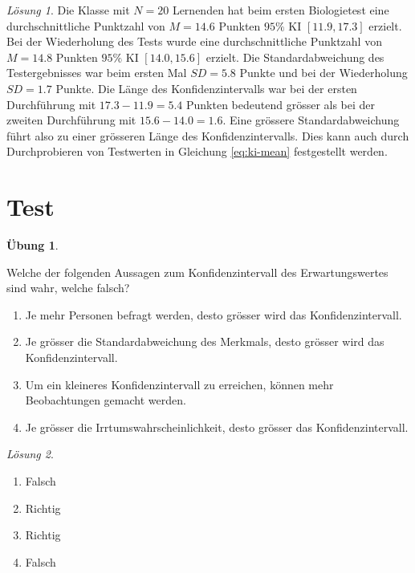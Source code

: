 \documentclass[
]{book}
\providecommand{\tightlist}{%
  \setlength{\itemsep}{0pt}\setlength{\parskip}{0pt}}
\theoremstyle{definition}
\theoremstyle{definition}
\theoremstyle{definition}
\newtheorem{exercise}{Übung}[chapter]
\theoremstyle{definition}
\theoremstyle{remark}
\newtheorem*{solution}{Lösung}
\begin{document}
\begin{solution}
Die Klasse mit \(N=20\) Lernenden hat beim ersten Biologietest eine durchschnittliche Punktzahl von \(M=14.6\) Punkten \(95\%\) KI \([11.9,17.3]\) erzielt. Bei der Wiederholung des Tests wurde eine durchschnittliche Punktzahl von \(M=14.8\) Punkten \(95\%\) KI \([14.0,15.6]\) erzielt. Die Standardabweichung des Testergebnisses war beim ersten Mal \(SD=5.8\) Punkte und bei der Wiederholung \(SD=1.7\) Punkte. Die Länge des Konfidenzintervalls war bei der ersten Durchführung mit \(17.3-11.9=5.4\) Punkten bedeutend grösser als bei der zweiten Durchführung mit \(15.6-14.0=1.6\). Eine grössere Standardabweichung führt also zu einer grösseren Länge des Konfidenzintervalls. Dies kann auch durch Durchprobieren von Testwerten in Gleichung \eqref{eq:ki-mean} festgestellt werden.
\end{solution}

\section{Test}\label{test-1}

\begin{exercise}
\protect\hypertarget{exr:ki-theory}{}\label{exr:ki-theory}

Welche der folgenden Aussagen zum Konfidenzintervall des Erwartungswertes sind wahr, welche falsch?

\begin{enumerate}
\def\labelenumi{\alph{enumi})}
\tightlist
\item
  Je mehr Personen befragt werden, desto grösser wird das Konfidenzintervall.
\item
  Je grösser die Standardabweichung des Merkmals, desto grösser wird das Konfidenzintervall.
\item
  Um ein kleineres Konfidenzintervall zu erreichen, können mehr Beobachtungen gemacht werden.
\item
  Je grösser die Irrtumswahrscheinlichkeit, desto grösser das Konfidenzintervall.
\end{enumerate}

\end{exercise}

\begin{solution}
\leavevmode

\begin{enumerate}
\def\labelenumi{\alph{enumi})}
\tightlist
\item
  Falsch
\item
  Richtig
\item
  Richtig
\item
  Falsch
\end{enumerate}

\end{solution}
\end{document}
